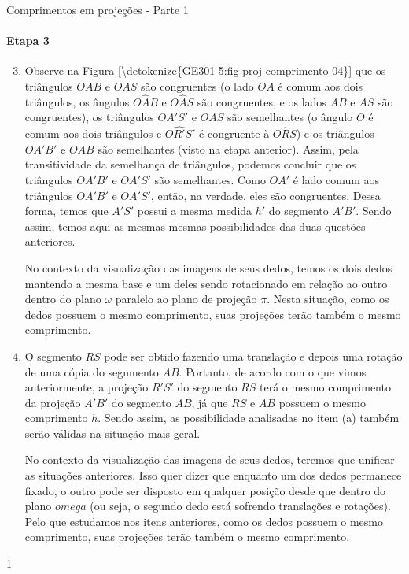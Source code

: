 \begin{answer}{Comprimentos em projeções - Parte 1}
{
\paragraph{Etapa 3}
\begin{enumerate}\setcounter{enumi}{2}
\item {} 
Observe na \hyperref[\detokenize{GE301-5:fig-proj-comprimento-04}]{Figura \ref{\detokenize{GE301-5:fig-proj-comprimento-04}}} que os triângulos \(OAB\) e \(OAS\) são congruentes (o lado \(OA\) é comum aos dois triângulos, os ângulos \(O\hat{A}B\) e \(O\hat{A}S\) são congruentes, e os lados \(AB\) e \(AS\) são congruentes), os triângulos \(OA'S'\) e \(OAS\) são semelhantes (o ângulo \(O\) é comum aos dois triângulos e \(O\hat{R'}S'\) é congruente à \(O\hat{R}S\)) e os triângulos \(OA'B'\) e \(OAB\) são semelhantes (visto na etapa anterior). Assim, pela transitividade da semelhança de triângulos, podemos concluir que os triângulos \(OA'B'\) e \(OA'S'\) são semelhantes. Como \(OA'\) é lado comum aos triângulos \(OA'B'\) e \(OA'S'\), então, na verdade, eles são congruentes. Dessa forma, temos que \(A'S'\) possui a mesma medida \(h'\) do segmento \(A'B'\). Sendo assim, temos aqui as mesmas mesmas possibilidades das duas questões anteriores.

No contexto da visualização das imagens de seus dedos, temos os dois dedos mantendo a mesma base e um deles sendo rotacionado em relação ao outro dentro do plano \(\omega\) paralelo ao plano de projeção \(\pi\). Nesta situação, como os dedos possuem o mesmo comprimento, suas projeções terão também o mesmo comprimento.

\item {} 
O segmento \(RS\) pode ser obtido fazendo uma translação e depois uma rotação de uma cópia do segumento \(AB\). Portanto, de acordo com o que vimos anteriormente, a projeção \(R'S'\) do segmento \(RS\) terá o mesmo comprimento da projeção \(A'B'\) do segmento \(AB\), já que \(RS\) e \(AB\) possuem o mesmo comprimento \(h\). Sendo assim, as possibilidade analisadas no item (a) também serão válidas na situação mais geral.

No contexto da visualização das imagens de seus dedos, teremos que unificar as situações anteriores. Isso quer dizer que enquanto um dos dedos permanece fixado, o outro pode ser disposto em qualquer posição desde que dentro do plano \(omega\) (ou seja, o segundo dedo está sofrendo translações e rotações). Pelo que estudamos nos itens anteriores, como os dedos possuem o mesmo comprimento, suas projeções terão também o mesmo comprimento. 
\end{enumerate}
}{1}
\end{answer}
